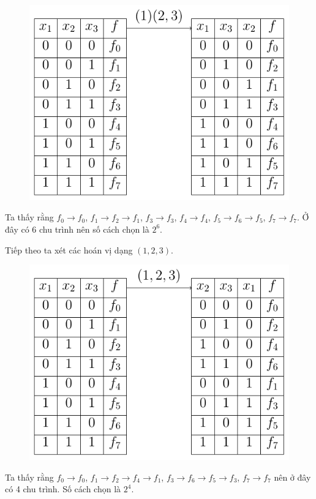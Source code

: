 \documentclass{mynotes}
\begin{document}
\begin{figure}[ht]
    \centering
    \includegraphics{./mynotes-figures/book2.pdf}
\end{figure}

Ta thấy rằng $f_0 \to f_0$, $f_1 \to f_2 \to f_1$, $f_3 \to f_3$, $f_4 \to f_4$, $f_5 \to f_6 \to f_5$, $f_7 \to f_7$. Ở đây có 6 chu trình nên số cách chọn là $2^6$.

Tiếp theo ta xét các hoán vị dạng $(1, 2, 3)$.

\begin{figure}[ht]
    \centering
    \includegraphics{./mynotes-figures/book3.pdf}
\end{figure}

Ta thấy rằng $f_0 \to f_0$, $f_1 \to f_2 \to f_4 \to f_1$, $f_3 \to f_6 \to f_5 \to f_3$, $f_7 \to f_7$ nên ở đây có 4 chu trình. Số cách chọn là $2^4$.
\end{document}
